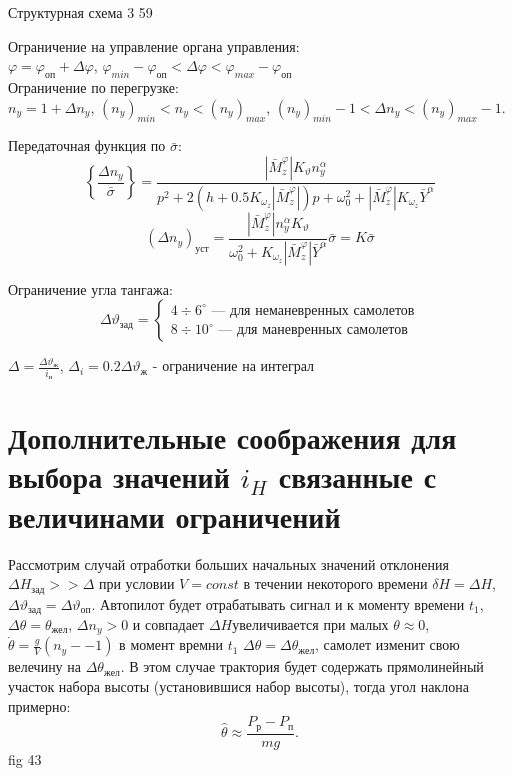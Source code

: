 \documentclass{article}
\begin{document}
Структурная схема 3 59

Ограничение на управление органа управления:\\
$\varphi = \varphi_{оп} + \Delta \varphi$, $\varphi_{min} - \varphi_{оп} < \Delta \varphi < \varphi_{max} - \varphi_{оп}$\\
Ограничение по перегрузке:\\
$n_y = 1 + \Delta n_y$, $(n_y)_{min} < n_y < (n_y)_{max}$, $(n_y)_{min} - 1 < \Delta n_y < (n_y)_{max} - 1$.  

Передаточная функция по $\bar{\sigma}$:
\[
    \left\{\frac{\Delta n_y}{\bar{\sigma}} \right\} =\frac{|\bar{M}_z^\varphi| K_{\vartheta} n_y^\alpha}{ p^2 + 2(h + 0.5 K_{\omega_z} | \bar{M}_z^{\varphi} |)p + \omega_0^2 + | \bar{M}_z^{\varphi}| K_{\omega_z} \bar{Y}^\alpha} 
\]
\[
    \left( \Delta n_y\right)_{уст} = \frac{| \bar{M}_z^{\varphi}| n_y^\alpha K_\vartheta}{\omega_0^2 + K_{\omega_z} | \bar{M}_z^{\varphi} | \bar{Y}^\alpha} \bar{\sigma} = K \bar{\sigma}
\]

Ограничение угла тангажа:
\begin{equation}
    \Delta \vartheta_{зад} =
\begin{cases}
    4 \div 6^\circ \text{ --- для неманевренных самолетов}\\
    8 \div 10^\circ \text{ --- для маневренных самолетов}

\end{cases}    
\end{equation}

$\Delta =\frac{\Delta \vartheta_ж}{i_н}$, $\Delta_i = 0.2 \Delta \vartheta_ж$ - ограничение на интеграл

\section{Дополнительные соображения для выбора значений $i_H$ связанные с величинами ограничений}
Рассмотрим случай отработки больших начальных значений отклонения $\Delta H_{зад} >> \Delta$ при условии $V = const$ в течении некоторого времени $\delta H = \Delta H$, $\Delta \vartheta_{зад}  = \Delta \vartheta_{оп}$. Автопилот будет отрабатывать сигнал и к моменту времени $t_1$, $\Delta \theta = \theta_{жел}$, $ \Delta n_y  >0 $ и совпадает $\Delta H$увеличивается при малых $\theta \approx 0$, $ \dot{\theta} = \frac{g}{V}(n_y - -1)$ в момент времни $t_1$ $\Delta \theta = \Delta \theta_{жел}$, самолет изменит свою велечину на $\Delta \theta_{жел}$. В этом случае трактория будет содержать прямолинейный участок набора высоты (установившися набор высоты), тогда угол наклона примерно:
\[
    \hat{\theta} \approx \frac{P_р - P_п}{mg}
.\]
fig 43
\end{document}
